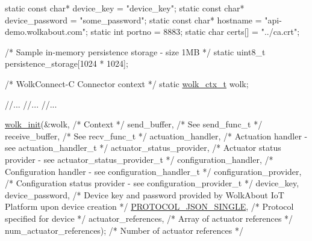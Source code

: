 \begin{DoxyCode}
\textcolor{keyword}{static} \textcolor{keyword}{const} \textcolor{keywordtype}{char}* device\_key = \textcolor{stringliteral}{"device\_key"};
\textcolor{keyword}{static} \textcolor{keyword}{const} \textcolor{keywordtype}{char}* device\_password = \textcolor{stringliteral}{"some\_password"};
\textcolor{keyword}{static} \textcolor{keyword}{const} \textcolor{keywordtype}{char}* hostname = \textcolor{stringliteral}{"api-demo.wolkabout.com"};
\textcolor{keyword}{static} \textcolor{keywordtype}{int} portno = 8883;
\textcolor{keyword}{static} \textcolor{keywordtype}{char} certs[] = \textcolor{stringliteral}{"../ca.crt"};

\textcolor{comment}{/* Sample in-memory persistence storage - size 1MB */}
\textcolor{keyword}{static} uint8\_t persistence\_storage[1024 * 1024];

\textcolor{comment}{/* WolkConnect-C Connector context */}
\textcolor{keyword}{static} \hyperlink{structwolk__ctx}{wolk\_ctx\_t} wolk;

\textcolor{comment}{//...}
\textcolor{comment}{//...}
\textcolor{comment}{//...}

\hyperlink{wolk__connector_8h_a607b5439ae7741284a73312b7794fa7a}{wolk\_init}(&wolk,                                             \textcolor{comment}{/* Context */}
          send\_buffer,                                       \textcolor{comment}{/* See send\_func\_t */}
          receive\_buffer,                                    \textcolor{comment}{/* See recv\_func\_t */}
          actuation\_handler,                                 \textcolor{comment}{/* Actuation handler        - see
       actuation\_handler\_t */}
          actuator\_status\_provider,                          \textcolor{comment}{/* Actuator status provider - see
       actuator\_status\_provider\_t */}
      configuration\_handler,                             \textcolor{comment}{/* Configuration handler        - see
       configuration\_handler\_t */}
      configuration\_provider,                            \textcolor{comment}{/* Configuration status provider - see
       configuration\_provider\_t */}
          device\_key, device\_password,                       \textcolor{comment}{/* Device key and password provided by
       WolkAbout IoT Platform upon device creation */}
          \hyperlink{wolk__connector_8h_a91e19fa4fff461493e1a41f7c7aa4e5fa9574b7cae2523f47c59e082e473223bd}{PROTOCOL\_JSON\_SINGLE},                              \textcolor{comment}{/* Protocol specified for
       device */}
          actuator\_references,                               \textcolor{comment}{/* Array of actuator references */}
          num\_actuator\_references);                          \textcolor{comment}{/* Number of actuator references */}


\end{DoxyCode}
